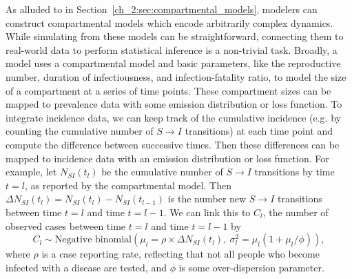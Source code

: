 As alluded to in Section~\ref{ch_2:sec:compartmental_models}, modelers can construct compartmental models which encode arbitrarily complex dynamics.
While simulating from these models can be straightforward, connecting them to real-world data to perform statistical inference is a non-trivial task.
Broadly, a model uses a compartmental model and basic parameters, like the reproductive number, duration of infectiousness, and infection-fatality ratio, to model the size of a compartment at a series of time points.
These compartment sizes can be mapped to prevalence data with some emission distribution or loss function.
To integrate incidence data, we can keep track of the cumulative incidence (e.g. by counting the cumulative number of \( S \to I \) transitions) at each time point and compute the difference between successive times.
Then these differences can be mapped to incidence data with an emission distribution or loss function.
For example, let \( N_{S I}(t_l) \) be the cumulative number of \( S \to I \) transitions by time \( t = l \), as reported by the compartmental model.
Then \( \Delta N_{S I}(t_l) = N_{S I}(t_l) - N_{S I}(t_{l-1}) \) is the number new \( S \to I \) transitions between time \( t = l \) and time \( t = l - 1 \).
We can link this to \( C_l \), the number of observed cases between time \( t = l \) and time \( t = l - 1 \) by
\begin{equation}
C_l \sim \text{Negative binomial}\left (\mu_l =  \rho \times \Delta N_{S I}(t_l),\ {\sigma^2_l} = \mu_l (1 + \mu_l / \phi )\right ),
\label{ch_2:eqn:example_case_emission}
\end{equation}
where \( \rho \) is a case reporting rate, reflecting that not all people who become infected with a disease are tested, and \( \phi \) is some over-dispersion parameter.

